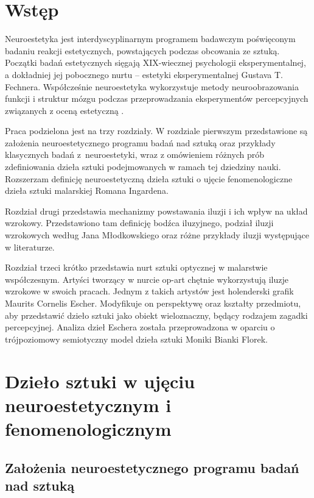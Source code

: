\documentclass[licencjacka]{kdypl}
\begin{document}
\tableofcontents \thispagestyle{empty}
\chapter*{Wstęp}


Neuroestetyka jest interdyscyplinarnym programem badawczym poświęconym badaniu reakcji estetycznych, powstających podczas obcowania ze sztuką. Początki badań estetycznych sięgają XIX-wiecznej psychologii eksperymentalnej, a dokładniej jej pobocznego nurtu -- estetyki eksperymentalnej Gustava T. Fechnera. Współcześnie neuroestetyka wykorzystuje metody neuroobrazowania funkcji i struktur mózgu podczas przeprowadzania eksperymentów percepcyjnych związanych z oceną estetyczną  \citep{Bremer}.

Praca podzielona jest na trzy rozdziały. W rozdziale pierwszym przedstawione są założenia neuroestetycznego programu badań nad sztuką oraz przykłady klasycznych badań z~neuroestetyki, wraz z omówieniem różnych prób zdefiniowania dzieła sztuki podejmowanych w ramach tej dziedziny nauki. Rozszerzam definicję neuroestetyczną dzieła sztuki o ujęcie fenomenologiczne dzieła sztuki malarskiej Romana Ingardena. 

Rozdział drugi przedstawia mechanizmy powstawania iluzji i ich wpływ na układ wzrokowy. Przedstawiono tam definicję bodźca iluzyjnego, podział iluzji wzrokowych według Jana Młodkowskiego oraz różne przykłady iluzji występujące w literaturze.


Rozdział trzeci krótko przedstawia nurt sztuki optycznej w malarstwie współczesnym. Artyści tworzący w nurcie op-art chętnie wykorzystują iluzje wzrokowe w swoich pracach. Jednym z takich artystów jest holenderski grafik Maurits Cornelis Escher.  Modyfikuje on perspektywę oraz kształty przedmiotu, aby przedstawić dzieło sztuki jako obiekt wieloznaczny, będący rodzajem zagadki percepcyjnej. Analiza dzieł Eschera została przeprowadzona w oparciu o trójpoziomowy semiotyczny model dzieła sztuki Moniki Bianki Florek.


\chapter{Dzieło sztuki w ujęciu neuroestetycznym i fenomenologicznym}\label{r1}

\section{Założenia neuroestetycznego programu badań nad sztuką}
\end{document}
